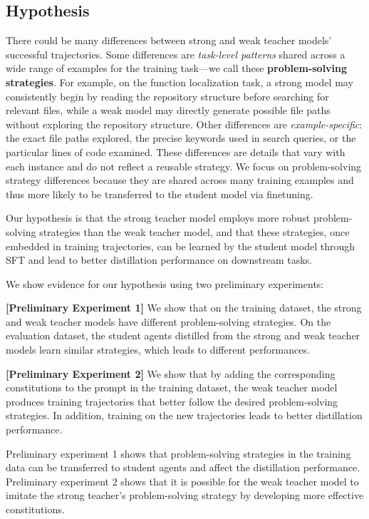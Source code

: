 \subsection{Hypothesis}
There could be many differences between strong and weak teacher models' successful trajectories.
Some differences are \emph{task-level patterns} shared across a wide range of examples for the training task---we call these \textbf{problem-solving strategies}.
For example, on the function localization task, a strong model may consistently begin by reading the repository structure before searching for relevant files, while a weak model may directly generate possible file paths without exploring the repository structure.
Other differences are \emph{example-specific}: the exact file paths explored, the precise keywords used in search queries, or the particular lines of code examined. These differences are details that vary with each instance and do not reflect a reusable strategy.
We focus on problem-solving strategy differences because they are shared across many training examples and thus more likely to be transferred to the student model via finetuning.

Our hypothesis is that the strong teacher model employs more robust problem-solving strategies than the weak teacher model, and that these strategies, once embedded in training trajectories, can be learned by the student model through SFT and lead to better distillation performance on downstream tasks.


We show evidence for our hypothesis using two preliminary experiments:

\noindent \textbf{[Preliminary Experiment 1]} We show that on the training dataset, the strong and weak teacher models have different problem-solving strategies. 
On the evaluation dataset, the student agents distilled from the strong and weak teacher models learn similar strategies, which leads to different performances.

\noindent \textbf{[Preliminary Experiment 2]} We show that by adding the corresponding constitutions to the prompt in the training dataset, the weak teacher model produces training trajectories that better follow the desired problem-solving strategies. In addition, training on the new trajectories leads to better distillation performance.

Preliminary experiment 1 shows that problem-solving strategies in the training data can be transferred to student agents and affect the distillation performance.
Preliminary experiment 2 shows that it is possible for the weak teacher model to imitate the strong teacher's problem-solving strategy by developing more effective constitutions.


